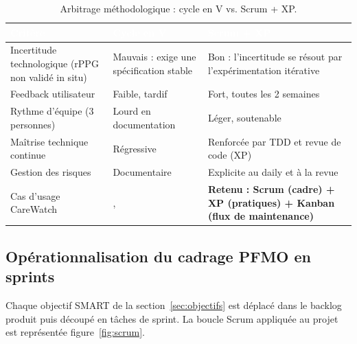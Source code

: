 \documentclass[11pt,a4paper]{article}
\begin{document}
\begin{table}[H]
\centering\small
\begin{tabularx}{\linewidth}{p{3.6cm} XX}
\toprule
\rowcolor{cwblue} \textcolor{white}{\bf Critère} & \textcolor{white}{\bf Cycle en V} & \textcolor{white}{\bf Scrum + XP} \\
\midrule
Incertitude technologique (rPPG non validé in situ) & Mauvais : exige une spécification stable &
 Bon : l'incertitude se résout par l'expérimentation itérative \\
Feedback utilisateur & Faible, tardif & Fort, toutes les 2 semaines \\
Rythme d'équipe (3 personnes) & Lourd en documentation & Léger, soutenable \\
Maîtrise technique continue & Régressive & Renforcée par TDD et revue de code (XP) \\
Gestion des risques & Documentaire & Explicite au daily et à la revue \\
Cas d'usage CareWatch &, & \textbf{Retenu : Scrum (cadre) + XP (pratiques) + Kanban (flux de maintenance)} \\
\bottomrule
\end{tabularx}
\caption{Arbitrage méthodologique : cycle en V vs. Scrum + XP.}
\label{tab:comparatif}
\end{table}

\subsection{Opérationnalisation du cadrage PFMO en sprints}
Chaque objectif SMART de la section~\ref{sec:objectifs} est déplacé dans le backlog produit puis
découpé en tâches de sprint. La boucle Scrum appliquée au projet est représentée figure~\ref{fig:scrum}.
\end{document}
